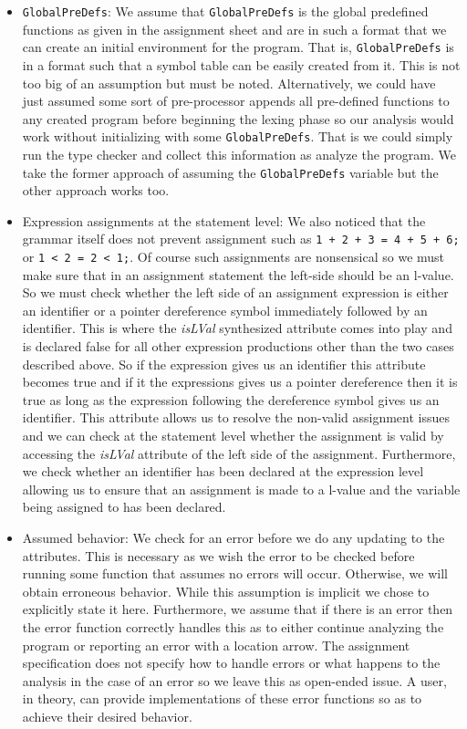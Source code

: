 \documentclass{article}
\begin{document}
\begin{itemize}
    \item \texttt{GlobalPreDefs}: We assume that \texttt{GlobalPreDefs} is the global predefined functions as given in the assignment sheet and are in such a format that we can create an initial environment for the program. That is, \texttt{GlobalPreDefs} is in a format such that a symbol table can be easily created from it. This is not too big of an assumption but must be noted. Alternatively, we could have just assumed some sort of pre-processor appends all pre-defined functions to any created program before beginning the lexing phase so our analysis would work without initializing with some \texttt{GlobalPreDefs}. That is we could simply run the type checker and collect this information as analyze the program. We take the former approach of assuming the \texttt{GlobalPreDefs} variable but the other approach works too.
    \item Expression assignments at the statement level: We also noticed that the grammar itself does not prevent assignment such as \texttt{1 + 2 + 3 = 4 + 5 + 6;} or \texttt{1 < 2 = 2 < 1;}. Of course such assignments are nonsensical so we must make sure that in an assignment statement the left-side should be an l-value. So we must check whether the left side of an assignment expression is either an identifier or a pointer dereference symbol immediately followed by an identifier. This is where the \textit{isLVal} synthesized attribute comes into play and is declared false for all other expression productions other than the two cases described above. So if the expression gives us an identifier this attribute becomes true and if it the expressions gives us a pointer dereference then it is true as long as the expression following the dereference symbol gives us an identifier. This attribute allows us to resolve the non-valid assignment issues and we can check at the statement level whether the assignment is valid by accessing the \textit{isLVal} attribute of the left side of the assignment. Furthermore, we check whether an identifier has been declared at the expression level allowing us to ensure that an assignment is made to a l-value and the variable being assigned to has been declared.
    \item Assumed behavior: We check for an error before we do any updating to the attributes. This is necessary as we wish the error to be checked before running some function that assumes no errors will occur. Otherwise, we will obtain erroneous behavior. While this assumption is implicit we chose to explicitly state it here. Furthermore, we assume that if there is an error then the error function correctly handles this as to either continue analyzing the program or reporting an error with a location arrow. The assignment specification does not specify how to handle errors or what happens to the analysis in the case of an error so we leave this as open-ended issue. A user, in theory, can provide implementations of these error functions so as to achieve their desired behavior.

\end{itemize}
\end{document}

